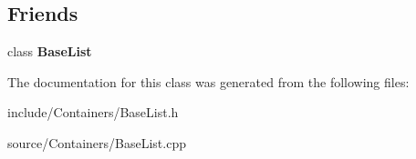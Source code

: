 \subsection*{Friends}
\begin{DoxyCompactItemize}
\item 
class {\bfseries Base\+List}\hypertarget{classDE_1_1BaseList_1_1BaseIterator_a6870f07ae8ce7c407b1572cae9417274}{}\label{classDE_1_1BaseList_1_1BaseIterator_a6870f07ae8ce7c407b1572cae9417274}

\end{DoxyCompactItemize}


The documentation for this class was generated from the following files\+:\begin{DoxyCompactItemize}
\item 
include/\+Containers/Base\+List.\+h\item 
source/\+Containers/Base\+List.\+cpp\end{DoxyCompactItemize}
